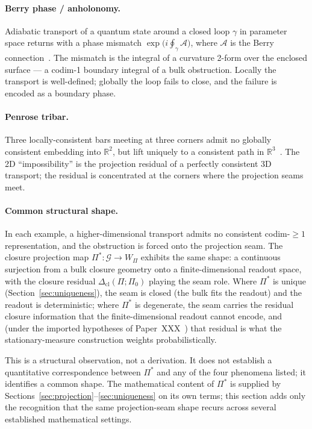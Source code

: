 \documentclass[12pt]{article}
\newcommand{\Gcal}{\mathcal{G}}
\newcommand{\Dcl}{\Delta_{\mathrm{cl}}}
\begin{document}
\paragraph{Berry phase / anholonomy.} Adiabatic transport of a quantum state around a closed loop $\gamma$ in parameter space returns with a phase mismatch $\exp\bigl(i\oint_\gamma \mathcal{A}\bigr)$, where $\mathcal{A}$ is the Berry connection~\citep{Berry1984}. The mismatch is the integral of a curvature 2-form over the enclosed surface --- a codim-1 boundary integral of a bulk obstruction. Locally the transport is well-defined; globally the loop fails to close, and the failure is encoded as a boundary phase.

\paragraph{Penrose tribar.} Three locally-consistent bars meeting at three corners admit no globally consistent embedding into $\mathbb{R}^2$, but lift uniquely to a consistent path in $\mathbb{R}^3$~\citep{PenroseTribar1958}. The 2D ``impossibility'' is the projection residual of a perfectly consistent 3D transport; the residual is concentrated at the corners where the projection seams meet.

\paragraph{Common structural shape.} In each example, a higher-dimensional transport admits no consistent codim-$\geq 1$ representation, and the obstruction is forced onto the projection seam. The closure projection map $\Pi^* : \Gcal \to W_\Pi$ exhibits the same shape: a continuous surjection from a bulk closure geometry onto a finite-dimensional readout space, with the closure residual $\Dcl(\Pi; \Pi_0)$ playing the seam role. Where $\Pi^*$ is unique (Section~\ref{sec:uniqueness}), the seam is closed (the bulk fits the readout) and the readout is deterministic; where $\Pi^*$ is degenerate, the seam carries the residual closure information that the finite-dimensional readout cannot encode, and (under the imported hypotheses of Paper~XXX~\citep{SmartXXX}) that residual is what the stationary-measure construction weights probabilistically.

This is a structural observation, not a derivation. It does not establish a quantitative correspondence between $\Pi^*$ and any of the four phenomena listed; it identifies a common shape. The mathematical content of $\Pi^*$ is supplied by Sections~\ref{sec:projection}--\ref{sec:uniqueness} on its own terms; this section adds only the recognition that the same projection-seam shape recurs across several established mathematical settings.
\end{document}
